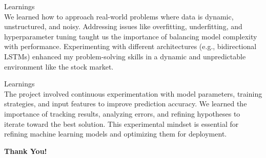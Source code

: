 \documentclass[9pt]{beamer}
\begin{document}
\begin{frame}{Learnings}
    \\[0.3cm]
    We learned how to approach real-world problems where data is dynamic,
    unstructured, and noisy. Addressing issues like overfitting, underfitting, and
    hyperparameter tuning taught us the importance of balancing model complexity
    with performance. Experimenting with different architectures (e.g.,
    bidirectional LSTMs) enhanced my problem-solving skills in a dynamic and
    unpredictable environment like the stock market.
\end{frame}

\begin{frame}{Learnings}
    \\[0.3cm]
    The project involved continuous experimentation with model parameters,
    training strategies, and input features to improve prediction accuracy. We
    learned the importance of tracking results, analyzing errors, and refining
    hypotheses to iterate toward the best solution. This experimental mindset is
    essential for refining machine learning models and optimizing them for
    deployment.
\end{frame}

\begin{frame}[c]
    \centering
    {\Huge \textbf{Thank You!}}\\[1cm]
\end{frame}
\end{document}
